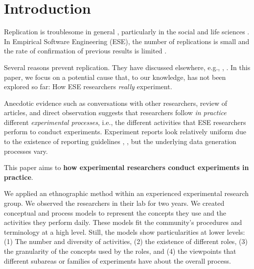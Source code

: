 \section{Introduction}\label{sec-introduction}
Replication is troublesome in general \cite{Klein-2018-many}, particularly in the social and life sciences \cite{Pashler-2012-perspectives} \cite{Baker-2016-lid-reproducibility}. In Empirical Software Engineering (ESE), the number of replications is small \cite{Bezerra-2015-Replication-SE-U-SMS} and the rate of confirmation of previous results is limited \cite{Jorgensen-2016-Incorrects-Results-SEE}.

Several reasons prevent replication. They have discussed elsewhere, e.g., \cite{Miller-2005-replicating-SE-experiments}, \cite{Demagalhaes-2015-replications-SE}. In this paper, we focus on a potential cause that, to our knowledge, has not been explored so far: How ESE researchers \textit{really} experiment. 

Anecdotic evidence such as conversations with other researchers, review of articles, and direct observation suggests that researchers follow \textit{in practice} different \textit{experimental processes}, i.e., the different activities that ESE researchers perform to conduct experiments. Experiment reports look relatively uniform due to the existence of reporting guidelines \cite{Carver-2010-guidelines-replication-SE}, \cite{Jedlitschka-2008-reporting-experiments-SE}, but the underlying data generation processes vary.

This paper aims to  \textbf{how experimental researchers conduct experiments in practice}. 

We applied an ethnographic method \cite{Sharp-2016-Ethnographic-Studies-ESE} within an experienced experimental research group. We observed the researchers in their lab for two years. We created conceptual and process models to represent the concepts they use and the activities they perform daily. These models fit the community's procedures and terminology at a high level. Still, the models show particularities at lower levels: (1) The number and diversity of activities, (2) the existence of different roles, (3) the granularity of the concepts used by the roles, and (4) the viewpoints that different subareas or families of experiments have about the overall process.

